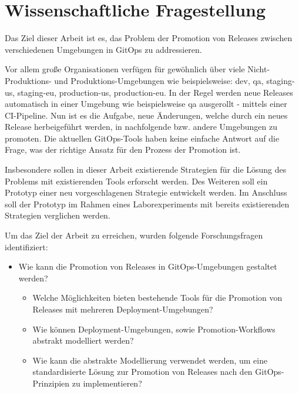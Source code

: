 \chapter{Wissenschaftliche Fragestellung}

Das Ziel dieser Arbeit ist es,
das Problem der Promotion von Releases zwischen verschiedenen Umgebungen in GitOps
zu addressieren.
\bigskip

\noindent
Vor allem große Organisationen verfügen für gewöhnlich über viele
Nicht-Produktions- und Produktions-Umgebungen
wie beispielsweise: dev, qa, staging-us, staging-eu, production-us, production-eu.
In der Regel werden neue Releases automatisch in einer Umgebung
wie beispielsweise qa ausgerollt - mittels einer CI-Pipeline.
Nun ist es die Aufgabe,
neue Änderungen, welche durch ein neues Release herbeigeführt werden,
in nachfolgende bzw. andere Umgebungen zu promoten.
Die aktuellen GitOps-Tools haben keine einfache Antwort auf
die Frage, was der richtige Ansatz für den Prozess der Promotion ist.
\bigskip

\noindent
Insbesondere sollen in dieser Arbeit
existierende Strategien für die Lösung des Problems
mit existierenden Tools erforscht werden.
Des Weiteren soll ein Prototyp einer neu vorgeschlagenen
Strategie entwickelt werden.
Im Anschluss soll der Prototyp im Rahmen eines Laborexperiments
mit bereits existierenden Strategien
verglichen werden.
\bigskip



\noindent
Um das Ziel der Arbeit zu erreichen, wurden folgende Forschungsfragen identifiziert:

\begin{itemize}
	\item Wie kann die Promotion von Releases in GitOps-Umgebungen gestaltet werden?
	\begin{itemize}
		\item Welche Möglichkeiten bieten bestehende Tools für die Promotion von Releases mit mehreren Deployment-Umgebungen?
		\item Wie können Deployment-Umgebungen, sowie Promotion-Workflows abstrakt modelliert werden?
		\item Wie kann die abstrakte Modellierung verwendet werden, um eine standardisierte Lösung zur Promotion von Releases nach den GitOps-Prinzipien zu implementieren?
	\end{itemize}
\end{itemize}

